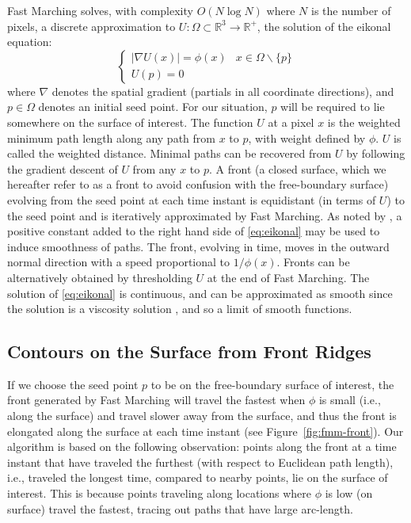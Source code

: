 \documentclass[10pt,journal,compsoc]{IEEEtran}
\newcommand{\R}{\mathbb{R}}
\begin{document}
Fast Marching solves, with complexity $O(N\log N)$ where $N$ is the
number of pixels, a discrete approximation to $U : \Omega \subset \R^3
\to \mathbb{R}^+$, the solution of the eikonal equation:
\begin{equation} \label{eq:eikonal}
  \begin{cases}
    |\nabla U(x)| = \phi(x) & x\in \Omega \backslash \{ p \}
    \\
    U(p) = 0 &
  \end{cases}
\end{equation}
where $\nabla$ denotes the spatial gradient (partials in all
coordinate directions), and $p \in \Omega$ denotes an initial seed
point. For our situation, $p$ will be required to lie somewhere on the
surface of interest. The function $U$ at a pixel $x$ is the weighted
minimum path length along any path from $x$ to $p$, with weight
defined by $\phi$. $U$ is called the weighted distance. Minimal paths
can be recovered from $U$ by following the gradient descent of $U$
from any $x$ to $p$. A front (a closed surface, which we hereafter
refer to as a front to avoid confusion with the free-boundary surface)
evolving from the seed point at each time instant is equidistant (in
terms of $U$) to the seed point and is iteratively approximated by
Fast Marching. As noted by \cite{cohen1997global}, a positive constant
added to the right hand side of \eqref{eq:eikonal} may be used to
induce smoothness of paths. The front, evolving in time, moves in the
outward normal direction with a speed proportional to
$1/\phi(x)$. Fronts can be alternatively obtained by thresholding $U$
at the end of Fast Marching. The solution of \eqref{eq:eikonal} is
continuous, and can be approximated as smooth since the solution is a
viscosity solution \cite{crandall1983viscosity}, and so a limit of
smooth functions.

\subsection{Contours on the Surface from Front Ridges}

\label{subsec:curve_extraction}

If we choose the seed point $p$ to be on the free-boundary surface of
interest, the front generated by Fast Marching will travel the fastest
when $\phi$ is small (i.e., along the surface) and travel slower away
from the surface, and thus the front is elongated along the surface at
each time instant (see Figure~\ref{fig:fmm-front}). Our algorithm is
based on the following observation: points along the front at a time
instant that have traveled the furthest (with respect to Euclidean
path length), i.e., traveled the longest time, compared to nearby
points, lie on the surface of interest. This is because points
traveling along locations where $\phi$ is low (on surface) travel
the fastest, tracing out paths that have large arc-length.
\end{document}
